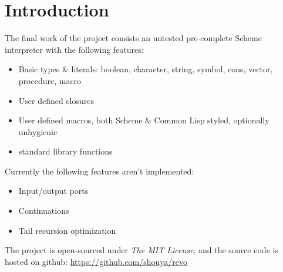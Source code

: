 \section{Introduction}

The final work of the project consists an untested pre-complete Scheme
interpreter with the following features:
\begin{itemize}
\item{Basic types \& literals: boolean, character, string, symbol,
    cons, vector, procedure, macro}
\item{User defined closures}
\item{User defined macros, both Scheme \& Common Lisp styled, optionally unhygienic}
\item{\RFIVERS standard library functions}
\end{itemize}

Currently the following \RFIVERS features aren't implemented:
\begin{itemize}
\item{Input/output ports}
\item{Continuations}
\item{Tail recursion optimization}
\end{itemize}

The project is open-sourced under \emph{The MIT License}, and the
source code is hosted on github: \url{https://github.com/shouya/revo}



\newpage


